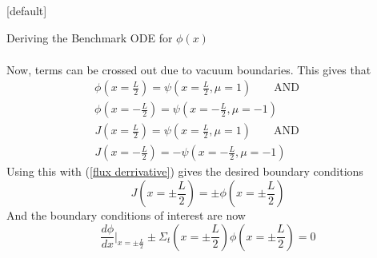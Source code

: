 \documentclass[9pt,t]{beamer}
\makeatletter
\newcommand{\QAND}{\qquad \text{AND} \qquad}
\newenvironment{withoutheadline}{
       \setbeamertemplate{headline}[default]
       \def\beamer@entrycode{\vspace*{-\headheight}}
    }{}
\makeatother
\begin{document}
\begin{withoutheadline}
\begin{frame}[allowframebreaks]{Deriving the Benchmark ODE for $\phi(x)$}
\begin{itemize}
\begin{multline}
        \end{multline}
        Now, terms can be crossed out due to vacuum boundaries. This gives that
        \begin{multline}
            \phi(x=\frac{L}{2}) =  \psi(x=\frac{L}{2},\mu =1) \QAND \\ \phi(x=-\frac{L}{2}) =  \psi(x=-\frac{L}{2},\mu =-1)
        \end{multline}
        \vspace*{-0.4cm}
        \begin{multline}
            J(x=\frac{L}{2}) = \psi(x=\frac{L}{2},\mu =1) \QAND \\ J(x=-\frac{L}{2}) = - \psi(x=-\frac{L}{2},\mu =-1)
        \end{multline}
        Using this with (\ref{flux derrivative}) gives the desired boundary conditions
        \begin{equation}
            J(x=\pm \frac{L}{2}) = \pm \phi(x=\pm \frac{L}{2})
        \end{equation}
        And the boundary conditions of interest are now
        \begin{equation}
            \frac{d\phi}{dx}\bigg|_{x=\pm \frac{L}{2}} \pm  \Sigma_{t}(x=\pm \frac{L}{2})  \phi(x=\pm \frac{L}{2})  = 0
        \end{equation}
    \end{itemize}
\end{frame}
\end{withoutheadline}
\end{document}
